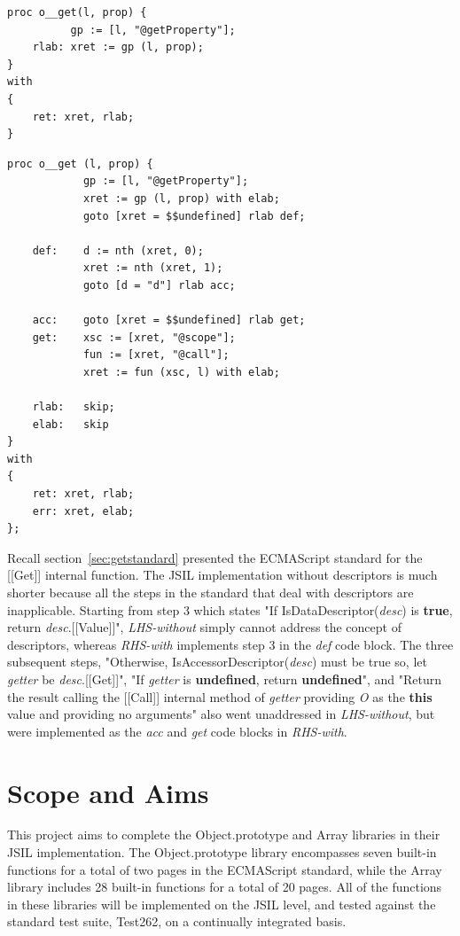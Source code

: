 \documentclass[a4paper,11pt,twoside]{report}
\begin{document}
\begin{minipage}{.45\textwidth}
\begin{lstlisting}
proc o__get(l, prop) {
          gp := [l, "@getProperty"];
    rlab: xret := gp (l, prop);
}
with
{
    ret: xret, rlab;
}
\end{lstlisting}
\end{minipage}%
\hfill
\begin{minipage}{.50\textwidth}
\begin{lstlisting}
proc o__get (l, prop) {
			gp := [l, "@getProperty"];
			xret := gp (l, prop) with elab;	
			goto [xret = $$undefined] rlab def;
			
	def:	d := nth (xret, 0);
			xret := nth (xret, 1);
			goto [d = "d"] rlab acc;
			
	acc:	goto [xret = $$undefined] rlab get;
	get:	xsc := [xret, "@scope"];
			fun := [xret, "@call"];
			xret := fun (xsc, l) with elab;
			
	rlab:	skip;
	elab:	skip
}
with
{
    ret: xret, rlab;
    err: xret, elab;
};
\end{lstlisting}
\end{minipage}

Recall section~\ref{sec:getstandard} presented the ECMAScript standard for the [[Get]] internal function. The JSIL implementation without descriptors is much shorter because all the steps in the standard that deal with descriptors are inapplicable. Starting from step 3 which states "If IsDataDescriptor(\textit{desc}) is \textbf{true}, return \textit{desc}.[[Value]]", \textit{LHS-without} simply cannot address the concept of descriptors, whereas \textit{RHS-with} implements step 3 in the \textit{def} code block. The three subsequent steps, "Otherwise, IsAccessorDescriptor(\textit{desc}) must be true so, let \textit{getter} be \textit{desc}.[[Get]]", "If \textit{getter} is \textbf{undefined}, return \textbf{undefined}", and "Return the result calling the [[Call]] internal method of \textit{getter} providing \textit{O} as the \textbf{this} value and providing no arguments" also went unaddressed in \textit{LHS-without}, but were implemented as the \textit{acc} and \textit{get} code blocks in \textit{RHS-with}.

\section{Scope and Aims}
This project aims to complete the Object.prototype and Array libraries in their JSIL implementation. The Object.prototype library encompasses seven built-in functions for a total of two pages in the ECMAScript standard, while the Array library includes 28 built-in functions for a total of 20 pages. All of the functions in these libraries will be implemented on the JSIL level, and tested against the standard test suite, Test262, on a continually integrated basis. 
\end{document}
